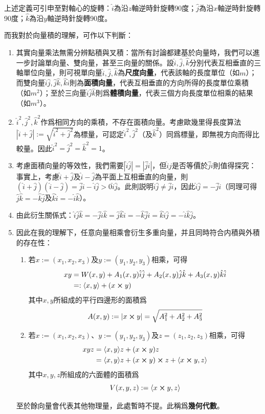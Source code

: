 \documentclass[12pt]{article}
\newcommand{\innerprod}[2]{\langle{#1},{#2}\rangle}
\begin{document}
    上述定義可引申至對軸心的旋轉：$\hat{i}$為沿$z$軸逆時針旋轉90度；$\hat{j}$為沿$x$軸逆時針旋轉90度；$\hat{k}$為沿$y$軸逆時針旋轉90度。

    而我對於向量積的理解，可作以下判斷：\begin{enumerate}
        \item 其實向量乘法無需分辨點積與叉積：當所有討論都建基於向量時，我們可以進一步討論單向量、雙向量，甚至三向量的關係。設$\hat{i},\hat{j},\hat{k}$分別代表互相垂直的三軸單位向量，則可視單向量$\hat{i},\hat{j},\hat{k}$為\textbf{尺度向量}，代表該軸的長度單位（如$m$）；而雙向量$\hat{i}\hat{j},\hat{j}\hat{k},\hat{k}\hat{i}$則為\textbf{面積向量}，代表互相垂直的方向所得的長度單位乘積（如$m^2$）；至於三向量$\hat{i}\hat{j}\hat{k}$則爲\textbf{體積向量}，代表三個方向長度單位相乘的結果（如$m^3$）。
        \item $\hat{i}^2,\hat{j}^2,\hat{k}^2$作爲相同方向的乘積，不存在面積向量。考慮歐幾里得長度算法$|\hat{i}+\hat{j}|:=\sqrt{\hat{i}^2+\hat{j}^2}$為標量，可認定$\hat{i}^2,\hat{j}^2$（及$\hat{k}^2$）同爲標量，即無視方向而得比較量。因此$\hat{i}^2=\hat{j}^2=\hat{k}^2=1$。
        \item 考慮面積向量的等效性，我們需要$|\hat{i}\hat{j}|=|\hat{j}\hat{i}|$，但$\hat{i}\hat{j}$是否等價於$\hat{j}\hat{i}$則值得探究：事實上，考慮$\hat{i}+\hat{j}$及$\hat{i}-\hat{j}$為平面上互相垂直的向量，則$(\hat{i}+\hat{j})(\hat{i}-\hat{j})=\hat{j}\hat{i}-\hat{i}\hat{j}>0\hat{i}\hat{j}$。此則説明$\hat{i}\hat{j}\neq\hat{j}\hat{i}$，因此$\hat{i}\hat{j}=-\hat{j}\hat{i}$（同理可得$\hat{j}\hat{k}=-\hat{k}\hat{j}$及$\hat{k}\hat{i}=-\hat{i}\hat{k}$）。
        \item 由此衍生關係式：$\hat{i}\hat{j}\hat{k}=-\hat{j}\hat{i}\hat{k}=\hat{j}\hat{k}\hat{i}=-\hat{k}\hat{j}\hat{i}=\hat{k}\hat{i}\hat{j}=-\hat{i}\hat{k}\hat{j}$。
        \item 因此在我的理解下，任意向量相乘會衍生多重向量，并且同時符合内積與外積的存在性：\begin{enumerate}
            \item 若$x:=(x_1,x_2,x_3)$及$y:=(y_1,y_2,y_3)$相乘，可得\begin{align*}
                xy&=W(x,y)+A_1(x,y)\hat{i}\hat{j}+A_2(x,y)\hat{j}\hat{k}+A_3(x,y)\hat{k}\hat{i}\\
                &=: \innerprod{x}{y}+(x\cross y)
            \end{align*}
            其中$x,y$所組成的平行四邊形的面積爲$$A(x,y):=|x\cross y|=\sqrt{A_1^2+A_2^2+A_3^2}$$
            \item 若$x:=(x_1,x_2,x_3)$、$y:=(y_1,y_2,y_3)$及$z=(z_1,z_2,z_3)$相乘，可得\begin{align*}
                xyz&=\innerprod{x}{y}z+(x\cross y)z\\
                &=\innerprod{x}{y}z+(x\cross y)\cross z + \innerprod{x\cross y}{z}
            \end{align*}
            其中$x,y,z$所組成的六面體的面積爲$$V(x,y,z):=\innerprod{x\cross y}{z}$$
        \end{enumerate}
        至於餘向量會代表其他物理量，此處暫時不提。此稱爲\textbf{幾何代數}。
    \end{enumerate}
\end{document}
